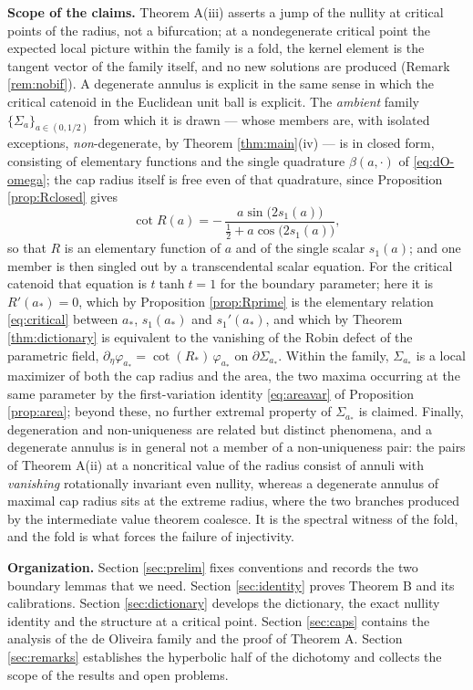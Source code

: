 \documentclass[10pt,a4paper]{amsart}
\begin{document}
\medskip
\noindent\textbf{Scope of the claims.} Theorem A(iii) asserts a jump of the nullity at critical points of the radius, not a bifurcation; at a nondegenerate critical point the expected local picture within the family is a fold, the kernel element is the tangent vector of the family itself, and no new solutions are produced (Remark \ref{rem:nobif}). A degenerate annulus is explicit in the same sense in which the critical catenoid in the Euclidean unit ball is explicit. The \emph{ambient} family $\{\Sigma_a\}_{a\in(0,1/2)}$ from which it is drawn --- whose members are, with isolated exceptions, \emph{non}-degenerate, by Theorem \ref{thm:main}(iv) --- is in closed form, consisting of elementary functions and the single quadrature $\beta(a,\cdot)$ of \eqref{eq:dO-omega}; the cap radius itself is free even of that quadrature, since Proposition \ref{prop:Rclosed} gives
\[
\cot R(a)=-\,\frac{a\sin\bigl(2s_1(a)\bigr)}{\tfrac12+a\cos\bigl(2s_1(a)\bigr)},
\]
so that $R$ is an elementary function of $a$ and of the single scalar $s_1(a)$; and one member is then singled out by a transcendental scalar equation. For the critical catenoid that equation is $t\tanh t=1$ for the boundary parameter; here it is $R'(a_*)=0$, which by Proposition \ref{prop:Rprime} is the elementary relation \eqref{eq:critical} between $a_*$, $s_1(a_*)$ and $s_1'(a_*)$, and which by Theorem \ref{thm:dictionary} is equivalent to the vanishing of the Robin defect of the parametric field, $\partial_\eta\varphi_{a_*}=\cot(R_*)\,\varphi_{a_*}$ on $\partial\Sigma_{a_*}$. Within the family, $\Sigma_{a_*}$ is a local maximizer of both the cap radius and the area, the two maxima occurring at the same parameter by the first-variation identity \eqref{eq:areavar} of Proposition \ref{prop:area}; beyond these, no further extremal property of $\Sigma_{a_*}$ is claimed. Finally, degeneration and non-uniqueness are related but distinct phenomena, and a degenerate annulus is in general not a member of a non-uniqueness pair: the pairs of Theorem A(ii) at a noncritical value of the radius consist of annuli with \emph{vanishing} rotationally invariant even nullity, whereas a degenerate annulus of maximal cap radius sits at the extreme radius, where the two branches produced by the intermediate value theorem coalesce. It is the spectral witness of the fold, and the fold is what forces the failure of injectivity.

\medskip
\noindent\textbf{Organization.} Section \ref{sec:prelim} fixes conventions and records the two boundary lemmas that we need. Section \ref{sec:identity} proves Theorem B and its calibrations. Section \ref{sec:dictionary} develops the dictionary, the exact nullity identity and the structure at a critical point. Section \ref{sec:caps} contains the analysis of the de Oliveira family and the proof of Theorem A. Section \ref{sec:remarks} establishes the hyperbolic half of the dichotomy and collects the scope of the results and open problems.
\end{document}
